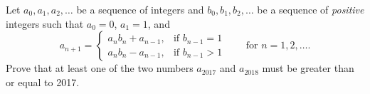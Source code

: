 Let $a_0, a_1, a_2, \ldots$ be a sequence of integers and $b_0, b_1, b_2, \ldots$ be a sequence of \emph{positive} integers such that $a_0 = 0$, $a_1 = 1$, and
\[
a_{n+1} = \begin{cases} a_n b_n + a_{n-1}, & \text{if } b_{n-1} = 1 \\ a_n b_n - a_{n-1}, & \text{if } b_{n-1} > 1 \end{cases} \qquad \text{for } n = 1, 2, \ldots.
\]
Prove that at least one of the two numbers $a_{2017}$ and $a_{2018}$ must be greater than or equal to 2017.
